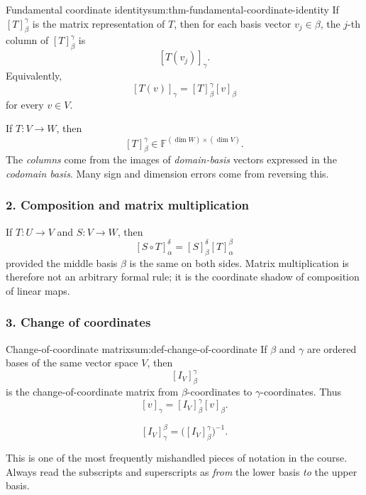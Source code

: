 \begin{theorem}{Fundamental coordinate identity}{sum:thm-fundamental-coordinate-identity}
If \([T]^\gamma_\beta\) is the matrix representation of \(T\), then for each basis vector \(v_j\in\beta\), the \(j\)-th column of \([T]^\gamma_\beta\) is
\[
[T(v_j)]_\gamma.
\]
Equivalently,
\[
[T(v)]_\gamma = [T]^\gamma_\beta [v]_\beta
\]
for every \(v\in V\).
\end{theorem}

\begin{commonmistake}[title={Common Mistake: mixing up rows, columns, and basis roles}]
If \(T:V\to W\), then
\[
[T]^\gamma_\beta \in \mathbb{F}^{(\dim W)\times (\dim V)}.
\]
The \emph{columns} come from the images of \emph{domain-basis} vectors expressed in the \emph{codomain basis}. Many sign and dimension errors come from reversing this.
\end{commonmistake}

\subsubsection*{2. Composition and matrix multiplication}

If \(T:U\to V\) and \(S:V\to W\), then
\[
[S\circ T]^\delta_\alpha = [S]^\delta_\beta [T]^\beta_\alpha
\]
provided the middle basis \(\beta\) is the same on both sides. Matrix multiplication is therefore not an arbitrary formal rule; it is the coordinate shadow of composition of linear maps.

\subsubsection*{3. Change of coordinates}

\begin{definition}{Change-of-coordinate matrix}{sum:def-change-of-coordinate}
If \(\beta\) and \(\gamma\) are ordered bases of the same vector space \(V\), then
\[
[I_V]^\gamma_\beta
\]
is the change-of-coordinate matrix from \(\beta\)-coordinates to \(\gamma\)-coordinates. Thus
\[
[v]_\gamma = [I_V]^\gamma_\beta [v]_\beta.
\]
\end{definition}

\begin{keyformula}[title={Key Formula: coordinate-change inverse relation}]
\[
[I_V]^\beta_\gamma = \bigl([I_V]^\gamma_\beta\bigr)^{-1}.
\]
\end{keyformula}

This is one of the most frequently mishandled pieces of notation in the course. Always read the subscripts and superscripts as \emph{from} the lower basis \emph{to} the upper basis.

